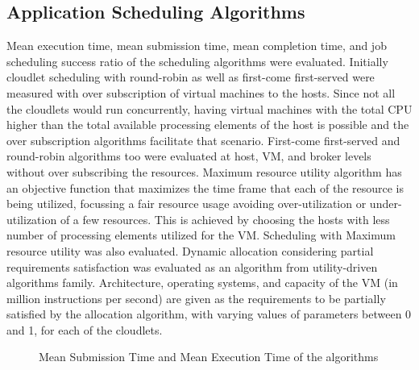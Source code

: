 \documentclass{llncs}
\begin{document}
\subsection{Application Scheduling Algorithms}
Mean execution time, mean submission time, mean completion time, and job scheduling success ratio of the scheduling algorithms were evaluated. Initially cloudlet scheduling with round-robin as well as first-come first-served were measured with over subscription of virtual machines to the hosts. Since not all the cloudlets would run concurrently, having virtual machines with the total CPU higher than the total available processing elements of the host is possible and the over subscription algorithms facilitate that scenario. First-come first-served and round-robin algorithms too were evaluated at host, VM, and broker levels without over subscribing the resources. Maximum resource utility algorithm has an objective function that maximizes the time frame that each of the resource is being utilized, focussing a fair resource usage avoiding over-utilization or under-utilization of a few resources. This is achieved by choosing the hosts with less number of processing elements utilized for the VM. Scheduling with Maximum resource utility was also evaluated. Dynamic allocation considering partial requirements satisfaction was evaluated as an algorithm from utility-driven algorithms family. Architecture, operating systems, and capacity of the VM (in million instructions per second) are given as the requirements to be partially satisfied by the allocation algorithm, with varying values of parameters between 0 and 1, for each of the cloudlets.

\begin{figure}[ht]
 \caption{Mean Submission Time and Mean Execution Time of the algorithms}
 \label{fig:met}
\end{figure}
\end{document}
